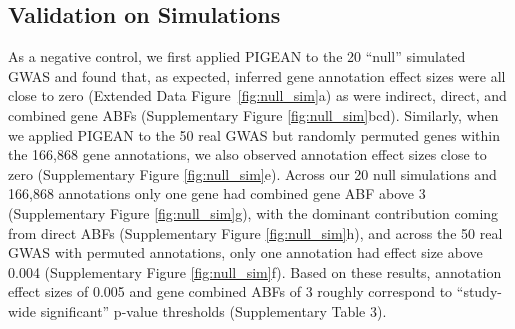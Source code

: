 \documentclass[sn-nature,lineno]{sn-jnl}%
\theoremstyle{thmstyleone}%
\theoremstyle{thmstyletwo}%
\theoremstyle{thmstylethree}%
\begin{document}
\subsection{Validation on Simulations}
As a negative control, we first applied PIGEAN to the 20 “null” simulated GWAS and found that, as expected, inferred gene annotation effect sizes were all close to zero (Extended Data Figure~\ref{fig:null_sim}a) as were indirect, direct, and combined gene ABFs (Supplementary Figure \ref{fig:null_sim}bcd). Similarly, when we applied PIGEAN to the 50 real GWAS but randomly permuted genes within the 166,868 gene annotations, we also observed annotation effect sizes close to zero (Supplementary  Figure \ref{fig:null_sim}e). Across our 20 null simulations and 166,868 annotations only one gene had combined gene ABF above 3 (Supplementary Figure \ref{fig:null_sim}g), with the dominant contribution coming from direct ABFs (Supplementary Figure \ref{fig:null_sim}h), and across the 50 real GWAS with permuted annotations, only one annotation had effect size above 0.004 (Supplementary Figure \ref{fig:null_sim}f). Based on these results, annotation effect sizes of 0.005 and gene combined ABFs of 3 roughly correspond to “study-wide significant” p-value thresholds (Supplementary Table 3).
\end{document}
